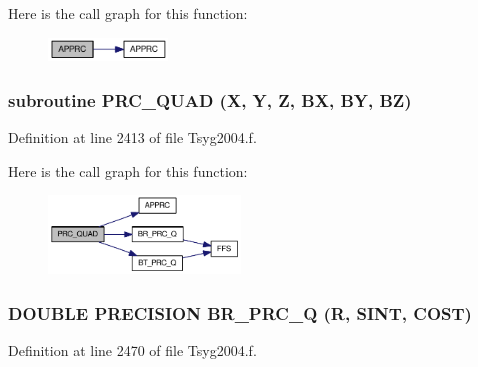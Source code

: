Here is the call graph for this function:\nopagebreak
\begin{figure}[H]
\begin{center}
\leavevmode
\includegraphics[width=90pt]{_tsyg2004_8f_d97fe9780c85165cf3d5efc106ad9f0e_cgraph}
\end{center}
\end{figure}
\hypertarget{_tsyg2004_8f_00310f7aecb95af18d5be726d529f907}{
\subsubsection[{PRC\_\-QUAD}]{\setlength{\rightskip}{0pt plus 5cm}subroutine PRC\_\-QUAD (X, \/  Y, \/  Z, \/  BX, \/  BY, \/  BZ)}}
\label{_tsyg2004_8f_00310f7aecb95af18d5be726d529f907}




Definition at line 2413 of file Tsyg2004.f.

Here is the call graph for this function:\nopagebreak
\begin{figure}[H]
\begin{center}
\leavevmode
\includegraphics[width=145pt]{_tsyg2004_8f_00310f7aecb95af18d5be726d529f907_cgraph}
\end{center}
\end{figure}
\hypertarget{_tsyg2004_8f_d87c020522fe895268a9166c3f8292f6}{
\subsubsection[{BR\_\-PRC\_\-Q}]{\setlength{\rightskip}{0pt plus 5cm}DOUBLE PRECISION BR\_\-PRC\_\-Q (R, \/  SINT, \/  COST)}}
\label{_tsyg2004_8f_d87c020522fe895268a9166c3f8292f6}




Definition at line 2470 of file Tsyg2004.f.

